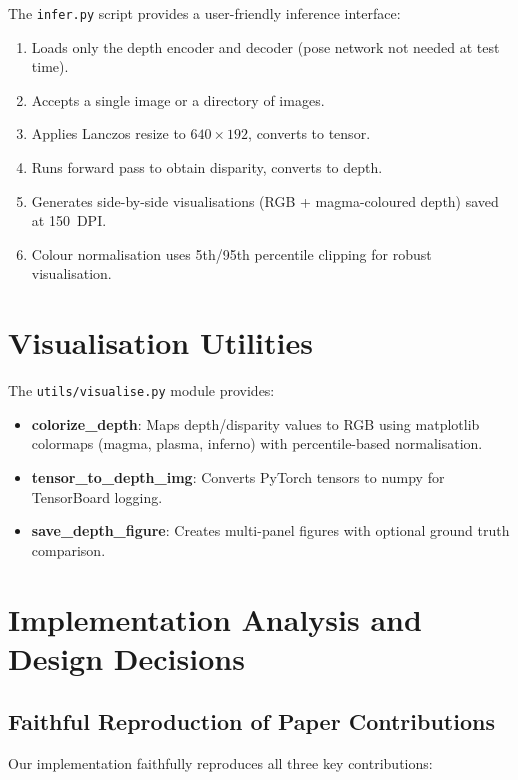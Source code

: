 \documentclass[10pt, a4paper, twocolumn]{article}
\begin{document}
The \texttt{infer.py} script provides a user-friendly inference interface:

\begin{enumerate}[noitemsep]
    \item Loads only the depth encoder and decoder (pose network not needed at test time).
    \item Accepts a single image or a directory of images.
    \item Applies Lanczos resize to $640\times192$, converts to tensor.
    \item Runs forward pass to obtain disparity, converts to depth.
    \item Generates side-by-side visualisations (RGB + magma-coloured depth) saved at 150~DPI.
    \item Colour normalisation uses 5th/95th percentile clipping for robust visualisation.
\end{enumerate}

\section{Visualisation Utilities}
\label{sec:vis}

The \texttt{utils/visualise.py} module provides:

\begin{itemize}[noitemsep]
    \item \textbf{colorize\_depth}: Maps depth/disparity values to RGB using matplotlib colormaps (magma, plasma, inferno) with percentile-based normalisation.
    \item \textbf{tensor\_to\_depth\_img}: Converts PyTorch tensors to numpy for TensorBoard logging.
    \item \textbf{save\_depth\_figure}: Creates multi-panel figures with optional ground truth comparison.
\end{itemize}

\section{Implementation Analysis and Design Decisions}
\label{sec:analysis}

\subsection{Faithful Reproduction of Paper Contributions}

Our implementation faithfully reproduces all three key contributions:
\end{document}
